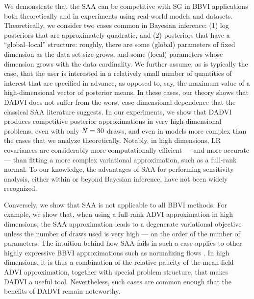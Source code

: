 We demonstrate that the SAA can be competitive with SG in BBVI applications both
theoretically and in experiments using real-world models and datasets.
Theoretically, we consider two cases common in Bayesian inference: (1) log
posteriors that are approximately quadratic, and (2) posteriors that have a
``global--local'' structure: roughly, there are some (global) parameters of
fixed dimension as the data set size grows, and some (local) parameters whose
dimension grows with the data cardinality. We further assume, as is typically
the case, that the user is interested in a relatively small number of quantities
of interest that are specified in advance, as opposed to, say, the maximum value
of a high-dimensional vector of posterior means.  In these cases, our theory
shows that DADVI does not suffer from the worst-case dimensional dependence that
the classical SAA literature suggests. In our experiments, we show that DADVI
produces competitive posterior approximations in very high-dimensional problems,
even with only $N = 30$ draws, and even in models more complex
than the cases that we analyze theoretically.  Notably, in high dimensions, LR
covariances are considerably more computationally efficient --- and more
accurate --- than fitting a more complex variational approximation, such as a
full-rank normal. To our knowledge, the advantages of SAA for performing
sensitivity analysis, either within or beyond Bayesian inference, have not been
widely recognized.

Conversely, we show that SAA is not applicable to all BBVI methods. For example,
we show that, when using a full-rank ADVI approximation in high dimensions, the
SAA approximation leads to a degenerate variational objective unless the number
of draws used is very high --- on the order of the number of parameters.
The intuition behind how SAA fails in such a case applies to other highly
expressive BBVI approximations such as normalizing flows
\citep{rezende:2015:flows}.
%
In high dimensions, it is thus a combination of the relative paucity of the
mean-field ADVI approximation, together with special problem structure, that
makes DADVI a useful tool. Nevertheless, such cases are common enough that the
benefits of DADVI remain noteworthy.

